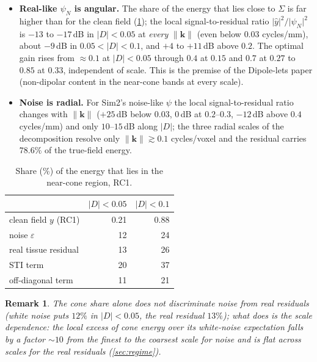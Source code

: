 \documentclass[11pt]{article}
\newcommand{\bk}{\bm{k}}
\newcommand{\norm}[1]{\lVert #1\rVert}
\newcommand{\abs}[1]{\lvert #1\rvert}
\newtheorem{remark}{Remark}
\begin{document}
\begin{itemize}[leftmargin=1.5em,itemsep=1pt]
\item \textbf{Real-like $\psi_N$ is angular.} The share of the energy that lies close to $\Sigma$ is far higher than for the clean field (\cref{tab:cone}); the local signal-to-residual ratio $\abs{\hat y}^2/\abs{\hat\psi_N}^2$ is $-13$ to $-17$\,dB in $\abs D<0.05$ at \emph{every} $\norm\bk$ (even below $0.03$ cycles/mm), about $-9$\,dB in $0.05<\abs D<0.1$, and $+4$ to $+11$\,dB above $0.2$. The optimal gain rises from $\approx0.1$ at $\abs D<0.05$ through $0.4$ at $0.15$ and $0.7$ at $0.27$ to $0.85$ at $0.33$, independent of scale. This is the premise of the Dipole-lets paper (non-dipolar content in the near-cone bands at every scale).
\item \textbf{Noise is radial.} For Sim2's noise-like $\psi$ the local signal-to-residual ratio changes with $\norm\bk$ ($+25$\,dB below $0.03$, $0$\,dB at $0.2$--$0.3$, $-12$\,dB above $0.4$ cycles/mm) and only $10$--$15$\,dB along $\abs D$; the three radial scales of the decomposition resolve only $\norm\bk\gtrsim0.1$ cycles/voxel and the residual carries $78.6\%$ of the true-field energy.
\end{itemize}
\begin{table}[h]\centering\small
\begin{tabular}{@{}lrr@{}}
\toprule
 & $\abs D<0.05$ & $\abs D<0.1$ \\
\midrule
clean field $y$ (RC1) & 0.21 & 0.88 \\
noise $\varepsilon$ & 12 & 24 \\
real tissue residual & 13 & 26 \\
STI term & 20 & 37 \\
off-diagonal term & 11 & 21 \\
\bottomrule
\end{tabular}
\caption{Share (\%) of the energy that lies in the near-cone region, RC1.}\label{tab:cone}
\end{table}
\begin{remark}
The cone share alone does not discriminate noise from real residuals (white noise puts $12\%$ in $\abs D<0.05$, the real residual $13\%$); what does is the \emph{scale dependence}: the local excess of cone energy over its white-noise expectation falls by a factor $\sim10$ from the finest to the coarsest scale for noise and is flat across scales for the real residuals (\cref{sec:regime}).
\end{remark}
\end{document}
